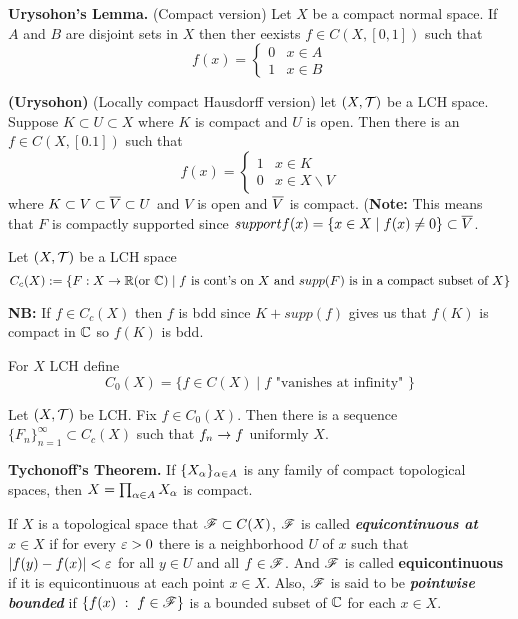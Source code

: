 \vs

\textbf{Urysohon's Lemma.} (Compact version) Let $X$ be a compact normal space. If $A$ and $B$ are disjoint sets in $X$ then ther eexists $f\in C(X, [0,1])$ such that 
\[f(x) = \begin{cases}
0 &  x \in A\\
1 &  x \in B\end{cases}\]

\setcounter{thm}{31}

\begin{thm}\textbf{(Urysohon)} (Locally compact Hausdorff version) let $(X, \mathcal{T})$ be a LCH space. Suppose $K\subset U \subset X$ where $K$ is compact and $U$ is open. Then there is an $f\in C(X, [0.1])$ such that 
\[f(x) = \begin{cases}
1 &  x \in K\\
0 &  x \in X\backslash V\end{cases}\]
where $K\subset V\subset \overline V\subset U$ and $V$ is open and $\overline V$ is compact. (\textbf{Note:} This means that $F$ is compactly supported since $support{f(x)} = \{x\in X\mid f(x) \neq 0\} \subset \overline V$.
\end{thm}

\vs

\dfn Let $(X, \mathcal{T})$ be a LCH space
\[C_c(X) := \{F: X\rightarrow \mathbb{R} (\text{or }\mathbb{C})\mid f\text{ is cont's on } X \text{ and } supp(F) \text{ is in a compact subset of }X\}\]


\textbf{NB:} If $f\in C_c(X)$ then $f$ is bdd since $K + supp(f)$ gives us that $f(K)$ is compact in $\mathbb{C}$ so $f(K)$ is bdd.

\dfn For $X$ LCH define
\[C_0(X) = \{f\in C(X)\mid f \text{ "vanishes at infinity" }\}\]

\setcounter{thm}{34}

\begin{prop}
Let $(X, \mathcal{T})$ be LCH. Fix $f\in C_0(X)$. Then there is a sequence $\{F_n\}_{n = 1}^\infty \subset C_c(X)$ such that $f_n \rightarrow f$ uniformly $X$.
\end{prop}

\vs

\textbf{Tychonoff's Theorem.} If $\{X_\alpha\}_{\alpha\in A}$ is any family of compact topological spaces, then $X = \prod_{\alpha\in A} X_\alpha$ is compact.

\vs

\dfn If $X$ is a topological space that $\mathscr{F}\subset C(X)$, $\mathscr{F}$ is called \textbf{\textit{equicontinuous at}} $x\in X$ if for every $\varepsilon > 0$ there is a neighborhood $U$ of $x$ such that $|f(y) - f(x)| < \varepsilon$ for all $y\in U$ and all $f\in \mathscr{F}$. And $\mathscr{F}$ is called \textbf{equicontinuous} if it is equicontinuous at each point $x\in X$. Also, $\mathscr{F}$ is said to be \textbf{\textit{pointwise bounded}} if $\{f(x)\ :\ f\in \mathscr{F}\}$ is a bounded subset of $\mathbb{C}$ for each $x\in X$.

